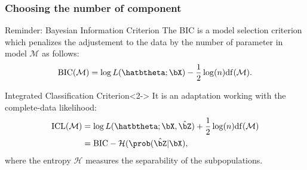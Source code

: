 \documentclass{beamer}\usepackage[]{graphicx}\usepackage[]{color}
\begin{document}
\begin{frame}
  \frametitle{Choosing the number of component}

  \begin{block}{Reminder: Bayesian Information Criterion}
    The BIC is a model selection criterion which penalizes the adjustement to the data by the number of parameter in model $\mathcal{M}$ as follows:
    \begin{equation*}
      \mathrm{BIC}(\mathcal{M}) = \log L(\hatbtheta; \bX) - \frac{1}{2}\log(n) \mathrm{df}(\mathcal{M}).
    \end{equation*}
  \end{block}

  \vspace{-.35cm}

  \begin{block}{Integrated Classification Criterion}<2->
    It is an adaptation working with the complete-data likelihood:
    \vspace{-.25cm}
    \begin{align*}
      \mathrm{ICL}(\mathcal{M}) & = \log L(\hatbtheta; \bX, \hat{\bZ}) + \frac{1}{2}\log(n) \mathrm{df}(\mathcal{M}) \\
      & = \mathrm{BIC} - \mathcal{H}(\prob(\hat \bZ | \bX),
    \end{align*}
    where the entropy $\mathcal{H}$ measures the separability of the subpopulations.
  \end{block}

  \vfill

\end{frame}
\end{document}

